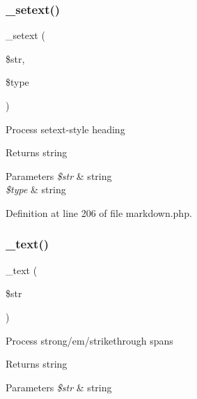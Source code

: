 \hypertarget{class_markdown_ad20b6a50b2c1d6b92556755efae0d5ae}{}\label{class_markdown_ad20b6a50b2c1d6b92556755efae0d5ae} 
\subsubsection{\texorpdfstring{\+\_\+setext()}{\_setext()}}
{\footnotesize\ttfamily \+\_\+setext (\begin{DoxyParamCaption}\item[{}]{\$str,  }\item[{}]{\$type }\end{DoxyParamCaption})\hspace{0.3cm}{\ttfamily [protected]}}

Process setext-\/style heading \begin{DoxyReturn}{Returns}
string 
\end{DoxyReturn}

\begin{DoxyParams}{Parameters}
{\em \$str} & string \\
\hline
{\em \$type} & string \\
\hline
\end{DoxyParams}


Definition at line 206 of file markdown.\+php.

\hypertarget{class_markdown_a11f2b2c375b61a22398e08bdb95aa4b6}{}\label{class_markdown_a11f2b2c375b61a22398e08bdb95aa4b6} 
\subsubsection{\texorpdfstring{\+\_\+text()}{\_text()}}
{\footnotesize\ttfamily \+\_\+text (\begin{DoxyParamCaption}\item[{}]{\$str }\end{DoxyParamCaption})\hspace{0.3cm}{\ttfamily [protected]}}

Process strong/em/strikethrough spans \begin{DoxyReturn}{Returns}
string 
\end{DoxyReturn}

\begin{DoxyParams}{Parameters}
{\em \$str} & string \\
\hline
\end{DoxyParams}


